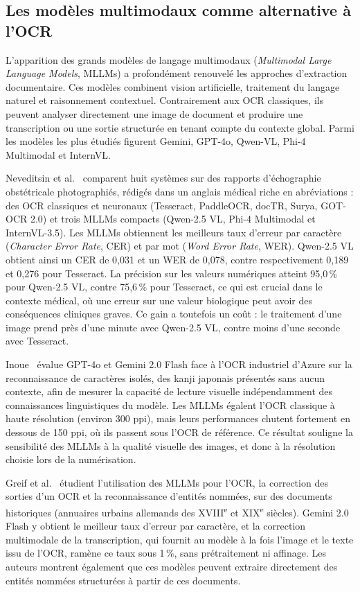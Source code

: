 \subsection{Les modèles multimodaux comme alternative à l'OCR}

L'apparition des grands modèles de langage multimodaux (\textit{Multimodal Large Language Models}, MLLMs) a profondément renouvelé les approches d'extraction documentaire. Ces modèles combinent vision artificielle, traitement du langage naturel et raisonnement contextuel. Contrairement aux OCR classiques, ils peuvent analyser directement une image de document et produire une transcription ou une sortie structurée en tenant compte du contexte global. Parmi les modèles les plus étudiés figurent Gemini, GPT-4o, Qwen-VL, Phi-4 Multimodal et InternVL.

Neveditsin et al.~\cite{neveditsin2026compact} comparent huit systèmes sur des rapports d'échographie obstétricale photographiés, rédigés dans un anglais médical riche en abréviations : des OCR classiques et neuronaux (Tesseract, PaddleOCR, docTR, Surya, GOT-OCR 2.0) et trois MLLMs compacts (Qwen-2.5 VL, Phi-4 Multimodal et InternVL-3.5). Les MLLMs obtiennent les meilleurs taux d'erreur par caractère (\textit{Character Error Rate}, CER) et par mot (\textit{Word Error Rate}, WER). Qwen-2.5 VL obtient ainsi un CER de 0,031 et un WER de 0,078, contre respectivement 0,189 et 0,276 pour Tesseract. La précision sur les valeurs numériques atteint 95,0\,\% pour Qwen-2.5 VL, contre 75,6\,\% pour Tesseract, ce qui est crucial dans le contexte médical, où une erreur sur une valeur biologique peut avoir des conséquences cliniques graves. Ce gain a toutefois un coût : le traitement d'une image prend près d'une minute avec Qwen-2.5 VL, contre moins d'une seconde avec Tesseract.

Inoue~\cite{inoue2025context} évalue GPT-4o et Gemini 2.0 Flash face à l'OCR industriel d'Azure sur la reconnaissance de caractères isolés, des kanji japonais présentés sans aucun contexte, afin de mesurer la capacité de lecture visuelle indépendamment des connaissances linguistiques du modèle. Les MLLMs égalent l'OCR classique à haute résolution (environ 300 ppi), mais leurs performances chutent fortement en dessous de 150 ppi, où ils passent sous l'OCR de référence. Ce résultat souligne la sensibilité des MLLMs à la qualité visuelle des images, et donc à la résolution choisie lors de la numérisation.

Greif et al.~\cite{greif2025multimodal} étudient l'utilisation des MLLMs pour l'OCR, la correction des sorties d'un OCR et la reconnaissance d'entités nommées, sur des documents historiques (annuaires urbains allemands des XVIII\textsuperscript{e} et XIX\textsuperscript{e} siècles). Gemini 2.0 Flash y obtient le meilleur taux d'erreur par caractère, et la correction multimodale de la transcription, qui fournit au modèle à la fois l'image et le texte issu de l'OCR, ramène ce taux sous 1\,\%, sans prétraitement ni affinage. Les auteurs montrent également que ces modèles peuvent extraire directement des entités nommées structurées à partir de ces documents.

